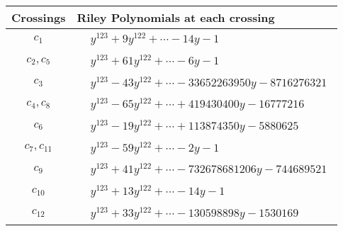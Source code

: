\documentclass[1p]{elsarticle_modified}
\theoremstyle{definition}
\begin{document}
\begin{tabular}{m{50pt}|m{274pt}}
Crossings & \hspace{64pt}Riley Polynomials at each crossing \\
\hline $$\begin{aligned}c_{1}\end{aligned}$$&$\begin{aligned}
&y^{123}+9 y^{122}+\cdots-14 y-1
\end{aligned}$\\
\hline $$\begin{aligned}c_{2},c_{5}\end{aligned}$$&$\begin{aligned}
&y^{123}+61 y^{122}+\cdots-6 y-1
\end{aligned}$\\
\hline $$\begin{aligned}c_{3}\end{aligned}$$&$\begin{aligned}
&y^{123}-43 y^{122}+\cdots-33652263950 y-8716276321
\end{aligned}$\\
\hline $$\begin{aligned}c_{4},c_{8}\end{aligned}$$&$\begin{aligned}
&y^{123}-65 y^{122}+\cdots+419430400 y-16777216
\end{aligned}$\\
\hline $$\begin{aligned}c_{6}\end{aligned}$$&$\begin{aligned}
&y^{123}-19 y^{122}+\cdots+113874350 y-5880625
\end{aligned}$\\
\hline $$\begin{aligned}c_{7},c_{11}\end{aligned}$$&$\begin{aligned}
&y^{123}-59 y^{122}+\cdots-2 y-1
\end{aligned}$\\
\hline $$\begin{aligned}c_{9}\end{aligned}$$&$\begin{aligned}
&y^{123}+41 y^{122}+\cdots-732678681206 y-744689521
\end{aligned}$\\
\hline $$\begin{aligned}c_{10}\end{aligned}$$&$\begin{aligned}
&y^{123}+13 y^{122}+\cdots-14 y-1
\end{aligned}$\\
\hline $$\begin{aligned}c_{12}\end{aligned}$$&$\begin{aligned}
&y^{123}+33 y^{122}+\cdots-130598898 y-1530169
\end{aligned}$\\
\hline
\end{tabular}\\~\\
\end{document}

